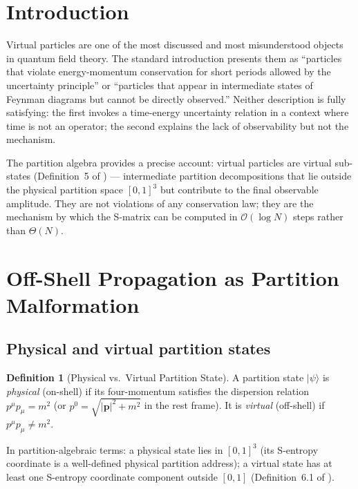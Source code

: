\documentclass[twocolumn,10pt,a4paper]{article}
\theoremstyle{thmstyle}
\theoremstyle{definition}
\newtheorem{definition}[theorem]{Definition}
\theoremstyle{remark}
\begin{document}
\section{Introduction}
\label{sec:intro}

Virtual particles are one of the most discussed and most misunderstood
objects in quantum field theory. The standard introduction presents them
as ``particles that violate energy-momentum conservation for short periods
allowed by the uncertainty principle'' or ``particles that appear in
intermediate states of Feynman diagrams but cannot be directly observed.''
Neither description is fully satisfying: the first invokes a time-energy
uncertainty relation in a context where time is not an operator; the second
explains the lack of observability but not the mechanism.

The partition algebra provides a precise account: virtual particles are
virtual sub-states (Definition~5 of \citealt{companion:trajectory}) ---
intermediate partition decompositions that lie outside the physical partition
space $[0,1]^3$ but contribute to the final observable amplitude.
They are not violations of any conservation law; they are the mechanism
by which the S-matrix can be computed in $\mathcal{O}(\log N)$ steps
rather than $\Theta(N)$.

\section{Off-Shell Propagation as Partition Malformation}
\label{sec:offshell}

\subsection{Physical and virtual partition states}

\begin{definition}[Physical vs.\ Virtual Partition State]
\label{def:virtual_qft}
A partition state $|\psi\rangle$ is \emph{physical} (on-shell) if its
four-momentum satisfies the dispersion relation $p^\mu p_\mu = m^2$
(or $p^0 = \sqrt{|\mathbf{p}|^2 + m^2}$ in the rest frame).
It is \emph{virtual} (off-shell) if $p^\mu p_\mu \neq m^2$.

In partition-algebraic terms: a physical state lies in $[0,1]^3$
(its S-entropy coordinate is a well-defined physical partition address);
a virtual state has at least one S-entropy coordinate component outside
$[0,1]$ (Definition~6.1 of \citealt{companion:trajectory}).
\end{definition}
\end{document}
